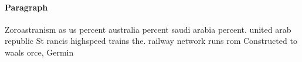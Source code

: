 \documentclass[a4paper]{article}
\begin{document}
\paragraph{Paragraph}
Zoroastranism as us percent australia percent saudi arabia percent. united arab republic St rancis highspeed trains the. railway network runs rom Constructed to waals orce, Germin
\end{document}
